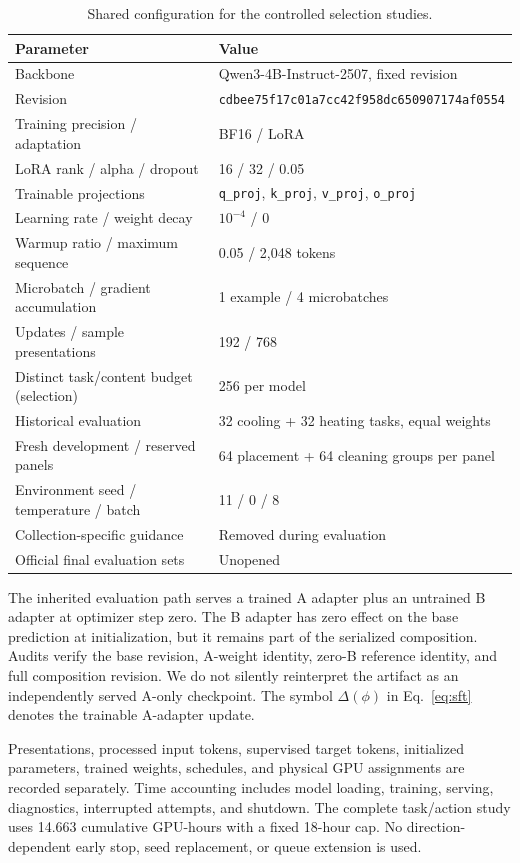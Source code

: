 \begin{table}[h]
\centering
\caption{Shared configuration for the controlled selection studies.}
\label{tab:config}
\small
\begin{tabular}{ll}
\toprule
Parameter & Value\\
\midrule
Backbone & Qwen3-4B-Instruct-2507, fixed revision\\
Revision & \texttt{cdbee75f17c01a7cc42f958dc650907174af0554}\\
Training precision / adaptation & BF16 / LoRA\\
LoRA rank / alpha / dropout & 16 / 32 / 0.05\\
Trainable projections & \texttt{q\_proj}, \texttt{k\_proj}, \texttt{v\_proj}, \texttt{o\_proj}\\
Learning rate / weight decay & $10^{-4}$ / 0\\
Warmup ratio / maximum sequence & 0.05 / 2,048 tokens\\
Microbatch / gradient accumulation & 1 example / 4 microbatches\\
Updates / sample presentations & 192 / 768\\
Distinct task/content budget (selection) & 256 per model\\
Historical evaluation & 32 cooling + 32 heating tasks, equal weights\\
Fresh development / reserved panels & 64 placement + 64 cleaning groups per panel\\
Environment seed / temperature / batch & 11 / 0 / 8\\
Collection-specific guidance & Removed during evaluation\\
Official final evaluation sets & Unopened\\
\bottomrule
\end{tabular}
\end{table}

The inherited evaluation path serves a trained A adapter plus an untrained B adapter at optimizer step zero. The B adapter has zero effect on the base prediction at initialization, but it remains part of the serialized composition. Audits verify the base revision, A-weight identity, zero-B reference identity, and full composition revision. We do not silently reinterpret the artifact as an independently served A-only checkpoint. The symbol $\Delta(\phi)$ in Eq.~\eqref{eq:sft} denotes the trainable A-adapter update.

Presentations, processed input tokens, supervised target tokens, initialized parameters, trained weights, schedules, and physical GPU assignments are recorded separately. Time accounting includes model loading, training, serving, diagnostics, interrupted attempts, and shutdown. The complete task/action study uses 14.663 cumulative GPU-hours with a fixed 18-hour cap. No direction-dependent early stop, seed replacement, or queue extension is used.

